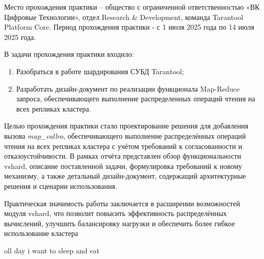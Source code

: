 \introduction

Место прохождения практики – общество с ограниченной ответственностью «ВК
Цифровые Технологии», отдел Research \& Development, команда Tarantool Platform
Core. Период прохождения практики - с 1 июля 2025 года по 14 июля 2025 года.

В задачи прохождения практики входило:

\begin{enumerate}
    \item Разобраться в работе шардирования СУБД Tarantool;
    \item Разработать дизайн-документ по реализации функционала Map-Reduce
          запроса, обеспечивающего выполнение распределенных операций чтения на
          всех репликах кластера.
\end{enumerate}

Целью прохождения практики стало проектирование решения для добавления вызова
\textit{map_callro}, обеспечивающего выполнение распределённых операций чтения
на всех репликах кластера с учётом требований к согласованности и
отказоустойчивости. В рамках отчёта представлен обзор функциональности vshard,
описание поставленной задачи, формулировка требований к новому механизму, а
также детальный дизайн-документ, содержащий архитектурные решения и сценарии
использования.

Практическая значимость работы заключается в расширении возможностей модуля
vshard, что позволит повысить эффективность распределённых вычислений, улучшить
балансировку нагрузки и обеспечить более гибкое использование кластера

oll day i want to sleep and eat
